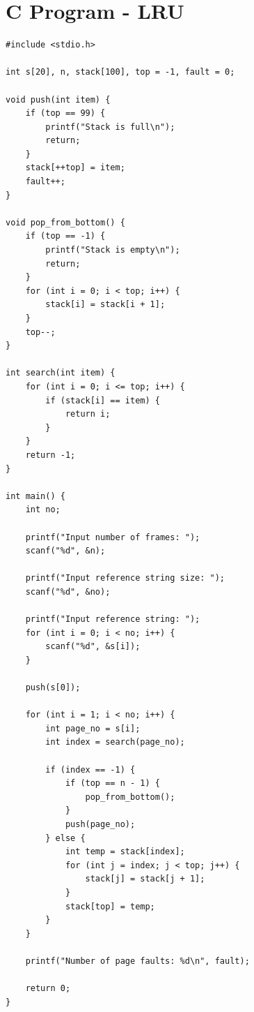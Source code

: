 \section{C Program - LRU}
\begin{lstlisting}[label={list:c_program:queue}]
#include <stdio.h>

int s[20], n, stack[100], top = -1, fault = 0;

void push(int item) {
    if (top == 99) {
        printf("Stack is full\n");
        return;
    }
    stack[++top] = item;
    fault++;
}

void pop_from_bottom() {
    if (top == -1) {
        printf("Stack is empty\n");
        return;
    }
    for (int i = 0; i < top; i++) {
        stack[i] = stack[i + 1];
    }
    top--;
}

int search(int item) {
    for (int i = 0; i <= top; i++) {
        if (stack[i] == item) {
            return i;
        }
    }
    return -1;
}

int main() {
    int no;

    printf("Input number of frames: ");
    scanf("%d", &n);

    printf("Input reference string size: ");
    scanf("%d", &no);

    printf("Input reference string: ");
    for (int i = 0; i < no; i++) {
        scanf("%d", &s[i]);
    }

    push(s[0]);

    for (int i = 1; i < no; i++) {
        int page_no = s[i];
        int index = search(page_no);

        if (index == -1) {
            if (top == n - 1) {
                pop_from_bottom();
            }
            push(page_no);
        } else {
            int temp = stack[index];
            for (int j = index; j < top; j++) {
                stack[j] = stack[j + 1];
            }
            stack[top] = temp;
        }
    }

    printf("Number of page faults: %d\n", fault);

    return 0;
}
\end{lstlisting}


